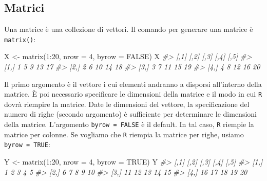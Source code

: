 \documentclass[
  11pt,
]{krantz}
\makeatletter
\newenvironment{Shaded}{\begin{snugshade}}{\end{snugshade}}
\newcommand{\AttributeTok}[1]{\textcolor[rgb]{0.61,0.61,0.61}{#1}}
\newcommand{\CommentTok}[1]{\textcolor[rgb]{0.37,0.37,0.37}{\textit{#1}}}
\newcommand{\ConstantTok}[1]{\textcolor[rgb]{0,0,0}{#1}}
\newcommand{\DecValTok}[1]{\textcolor[rgb]{0.06,0.06,0.06}{#1}}
\newcommand{\FunctionTok}[1]{\textcolor[rgb]{0,0,0}{#1}}
\newcommand{\NormalTok}[1]{#1}
\newcommand{\OtherTok}[1]{\textcolor[rgb]{0.37,0.37,0.37}{#1}}
\newcommand{\SpecialCharTok}[1]{\textcolor[rgb]{0,0,0}{#1}}
\newenvironment{kframe}{%
\medskip{}
\setlength{\fboxsep}{.8em}
 \def\at@end@of@kframe{}%
 \ifinner\ifhmode%
  \def\at@end@of@kframe{\end{minipage}}%
  \begin{minipage}{\columnwidth}%
 \fi\fi%
 \def\FrameCommand##1{\hskip\@totalleftmargin \hskip-\fboxsep
 \colorbox{shadecolor}{##1}\hskip-\fboxsep
     \hskip-\linewidth \hskip-\@totalleftmargin \hskip\columnwidth}%
 \MakeFramed {\advance\hsize-\width
   \@totalleftmargin\z@ \linewidth\hsize
   \@setminipage}}%
 {\par\unskip\endMakeFramed%
 \at@end@of@kframe}
\renewenvironment{Shaded}{\begin{kframe}}{\end{kframe}}
\theoremstyle{definition}
\theoremstyle{definition}
\theoremstyle{definition}
\theoremstyle{definition}
\theoremstyle{remark}
\makeatother
\begin{document}
\hypertarget{matrici}{%
\subsection{Matrici}\label{matrici}}

Una matrice è una collezione di vettori. Il comando per generare una matrice è \texttt{matrix()}:

\begin{Shaded}
\begin{Highlighting}[]
\NormalTok{X }\OtherTok{\textless{}{-}} \FunctionTok{matrix}\NormalTok{(}\DecValTok{1}\SpecialCharTok{:}\DecValTok{20}\NormalTok{, }\AttributeTok{nrow =} \DecValTok{4}\NormalTok{, }\AttributeTok{byrow =} \ConstantTok{FALSE}\NormalTok{)}
\NormalTok{X}
\CommentTok{\#\textgreater{}      [,1] [,2] [,3] [,4] [,5]}
\CommentTok{\#\textgreater{} [1,]    1    5    9   13   17}
\CommentTok{\#\textgreater{} [2,]    2    6   10   14   18}
\CommentTok{\#\textgreater{} [3,]    3    7   11   15   19}
\CommentTok{\#\textgreater{} [4,]    4    8   12   16   20}
\end{Highlighting}
\end{Shaded}

Il primo argomento è il vettore i cui elementi andranno a disporsi all'interno della matrice. È poi necessario specificare le dimensioni della matrice e il modo in cui \texttt{R} dovrà riempire la matrice. Date le dimensioni del vettore, la specificazione del numero di righe (secondo argomento) è sufficiente per determinare le dimensioni della matrice. L'argomento \texttt{byrow\ =\ FALSE} è il default. In tal caso, \texttt{R} riempie la matrice per colonne. Se vogliamo che \texttt{R} riempia la matrice per righe, usiamo \texttt{byrow\ =\ TRUE}:

\begin{Shaded}
\begin{Highlighting}[]
\NormalTok{Y }\OtherTok{\textless{}{-}} \FunctionTok{matrix}\NormalTok{(}\DecValTok{1}\SpecialCharTok{:}\DecValTok{20}\NormalTok{, }\AttributeTok{nrow =} \DecValTok{4}\NormalTok{, }\AttributeTok{byrow =} \ConstantTok{TRUE}\NormalTok{)}
\NormalTok{Y}
\CommentTok{\#\textgreater{}      [,1] [,2] [,3] [,4] [,5]}
\CommentTok{\#\textgreater{} [1,]    1    2    3    4    5}
\CommentTok{\#\textgreater{} [2,]    6    7    8    9   10}
\CommentTok{\#\textgreater{} [3,]   11   12   13   14   15}
\CommentTok{\#\textgreater{} [4,]   16   17   18   19   20}
\end{Highlighting}
\end{Shaded}
\end{document}
